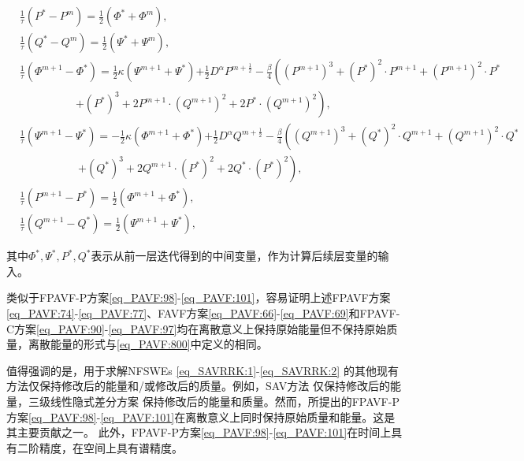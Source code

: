 \begin{enumerate}[$\bullet$]
\begin{align}
&\frac{1}{\tau}\left(P^{*}-P^{m}\right)=\frac{1}{2}(\varPhi^{*}+\varPhi^{m}),\label{eq_PAVF:92}\\
&\frac{1}{\tau}\left(Q^{*}-Q^{m}\right)=\frac{1}{2}(\Psi^{*}+\Psi^{m}),\label{eq_PAVF:93}\\
&\frac{1}{\tau}\left(\varPhi^{m+1}-\varPhi^{*}\right)=\frac{1}{2}\kappa (\Psi^{m+1}+\Psi^{*}){+\frac{1}{2}D^{\alpha} P^{m+\frac{1}{2}}}-\frac{\beta}{4}\left((P^{m+1})^3+(P^{*})^{2}\cdot P^{m+1}+(P^{m+1})^{2}\cdot P^{*}\right.\nonumber\\
		&~~~~~~~~~~~~~~~~~~~~~~~\left.+ (P^{*})^{3}+2 P^{m+1}\cdot (Q^{m+1})^{2}+2 P^{*}\cdot (Q^{m+1})^{2}\right),\label{eq_PAVF:94}\\
&\frac{1}{\tau}\left(\Psi^{m+1}-\Psi^{*}\right)=-\frac{1}{2}\kappa (\varPhi^{m+1}+\varPhi^{*}){+\frac{1}{2}D^{\alpha} Q^{m+\frac{1}{2}}}-\frac{\beta}{4}\left((Q^{m+1})^3+(Q^{*})^{2}\cdot Q^{m+1}+(Q^{m+1})^{2}\cdot Q^{*}\right.\nonumber\\
		&~~~~~~~~~~~~~~~~~~~~~~~~\left.+ (Q^{*})^{3}+2 Q^{m+1}\cdot (P^{*})^{2}+2 Q^{*}\cdot (P^{*})^{2}\right),\label{eq_PAVF:95}\\
&\frac{1}{\tau}\left(P^{m+1}-P^{*}\right)=\frac{1}{2}(\varPhi^{m+1}+\varPhi^{*}),\label{eq_PAVF:96}\\
&\frac{1}{\tau}\left(Q^{m+1}-Q^{*}\right)=\frac{1}{2}(\Psi^{m+1}+\Psi^{*}),\label{eq_PAVF:97}
\end{align}
\end{enumerate}
其中$\Phi^*, \Psi^*, P^*, Q^*$表示从前一层迭代得到的中间变量，作为计算后续层变量的输入。

\begin{remark}\label{rk_PAVF:1}
类似于FPAVF-P方案\eqref{eq_PAVF:98}-\eqref{eq_PAVF:101}，容易证明上述FPAVF方案\eqref{eq_PAVF:74}-\eqref{eq_PAVF:77}、FAVF方案\eqref{eq_PAVF:66}-\eqref{eq_PAVF:69}和FPAVF-C方案\eqref{eq_PAVF:90}-\eqref{eq_PAVF:97}均在离散意义上保持原始能量但不保持原始质量，离散能量的形式与\eqref{eq_PAVF:800}中定义的相同。
\end{remark}

\begin{remark}\label{rk_PAVF:2}
值得强调的是，用于求解NFSWEs \eqref{eq_SAVRRK:1}-\eqref{eq_SAVRRK:2} 的其他现有方法仅保持修改后的能量和/或修改后的质量。例如，SAV方法 
仅保持修改后的能量，三级线性隐式差分方案
保持修改后的能量和质量。然而，所提出的FPAVF-P方案\eqref{eq_PAVF:98}-\eqref{eq_PAVF:101}在离散意义上同时保持原始质量和能量。这是其主要贡献之一。
此外，FPAVF-P方案\eqref{eq_PAVF:98}-\eqref{eq_PAVF:101}在时间上具有二阶精度，在空间上具有谱精度。
\end{remark}


